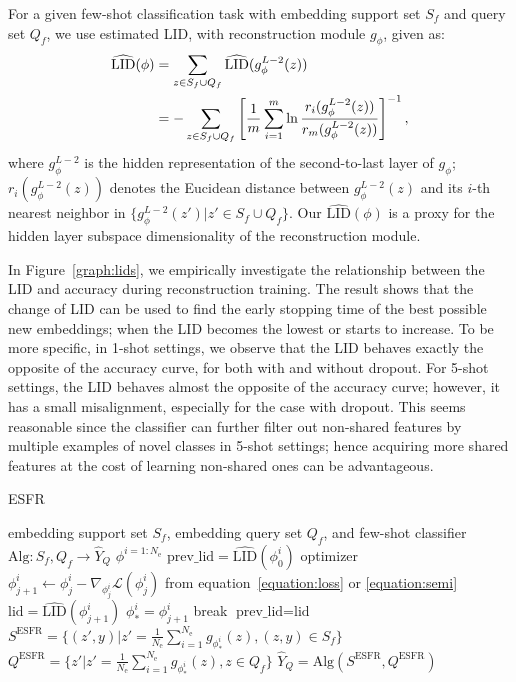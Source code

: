\documentclass{article}
\begin{document}
For a given few-shot classification task with embedding support set $S_f$ and query set $Q_f$, we use estimated LID, with reconstruction module $g_{\phi}$, given as:
\begin{align}
\label{equation:lid}
\widehat{\text{LID}}(\phi) &= \sum_{z\in S_f\cup Q_f} \widehat{\text{LID}}(g^{L-2}_\phi(z)) \notag \\
&= -\sum_{z\in S_f\cup Q_f} \left[\frac{1}{m}\sum_{i=1}^m \ln\frac{r_i(g^{L-2}_\phi(z))}{r_m(g^{L-2}_\phi(z))}\right]^{-1},
\end{align}
where $g^{L-2}_\phi$ is the hidden representation of the second-to-last layer of $g_\phi$; $r_i(g^{L-2}_\phi(z))$ denotes the Eucidean distance between $g^{L-2}_\phi(z)$ and its $i$-th nearest neighbor in $\{g^{L-2}_\phi(z')|z'\in S_f\cup Q_f\}$.
Our $\widehat{\text{LID}}(\phi)$ is a proxy for the hidden layer subspace dimensionality of the reconstruction module.

In Figure~\ref{graph:lids}, we empirically investigate the relationship between the LID and accuracy during reconstruction training.
The result shows that the change of LID can be used to find the early stopping time of the best possible new embeddings; when the LID becomes the lowest or starts to increase.
To be more specific, in 1-shot settings, we observe that the LID behaves exactly the opposite of the accuracy curve, for both with and without dropout.
For 5-shot settings, the LID behaves almost the opposite of the accuracy curve; however, it has a small misalignment, especially for the case with dropout.
This seems reasonable since the classifier can further filter out non-shared features by multiple examples of novel classes in 5-shot settings; hence acquiring more shared features at the cost of learning non-shared ones can be advantageous. \begin{algorithm}[tb]
	\caption{ESFR}
	\label{alg:proposed}
	\begin{algorithmic}
		 embedding support set $S_f$, embedding query set $Q_f$, and few-shot classifier $\text{Alg}:S_f,Q_f\rightarrow \widehat{Y}_Q$
		 $\phi^{i=1:N_\text{e}}$
		\STATE $\text{prev\_lid}=\widehat{\text{LID}}(\phi^i_0)$ 
		 optimizer
		\STATE $\phi^i_{j+1} \leftarrow \phi^i_j - \nabla_{\phi^i_j}\mathcal{L}(\phi^i_j)$ from equation~\ref{equation:loss} or \ref{equation:semi}
		\STATE $\text{lid}=\widehat{\text{LID}}(\phi^i_{j+1})$
		\STATE $\phi^i_* = \phi^i_{j + 1}$
		\STATE break
		\ENDIF
		\STATE $\text{prev\_lid}=\text{lid}$
		\ENDFOR
		\ENDFOR
		\STATE $S^\text{ESFR} = \{(z', y)|z'=\frac{1}{N_\text{e}}\sum_{i=1}^{N_\text{e}} g_{\phi^i_*}(z), (z,y)\in S_f\}$ \STATE $Q^\text{ESFR} = \{z'|z'=\frac{1}{N_\text{e}}\sum_{i=1}^{N_\text{e}} g_{\phi^i_*}(z), z\in Q_f\}$
		  $ \widehat{Y}_Q = \text{Alg}(S^\text{ESFR}, Q^\text{ESFR})$ 
	\end{algorithmic}
\end{algorithm}
\end{document}
